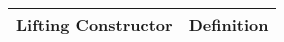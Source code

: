 \begin{table}[H]
\begin{scriptsize}
\begin{center}
\begin{tabular}{|l|l|}
\hline
\multicolumn{1}{|c|}{\Tstrut \Bstrut\footnotesize Lifting Constructor} & \multicolumn{1}{c|}{\Tstrut \Bstrut \footnotesize Definition} \\
\hline
\hline

\end{tabular}
\end{center}
\end{scriptsize}
\end{table}
